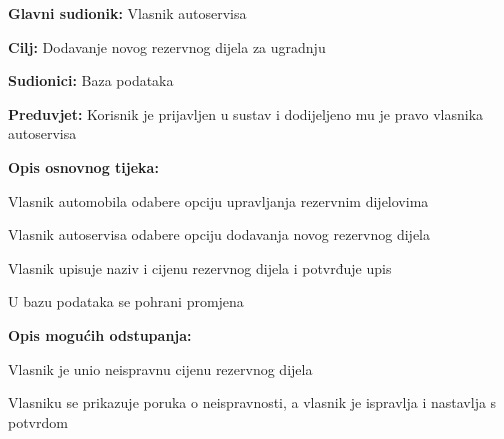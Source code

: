 					
					\noindent {}
					\begin{packed_item}
						
						\item \textbf{Glavni sudionik: } Vlasnik autoservisa
						\item  \textbf{Cilj:} Dodavanje novog rezervnog dijela za ugradnju
						\item  \textbf{Sudionici:} Baza podataka
						\item  \textbf{Preduvjet:} Korisnik je prijavljen u sustav i dodijeljeno mu je pravo vlasnika autoservisa
						\item  \textbf{Opis osnovnog tijeka:}
						
						\item[] \begin{packed_enum}
							
							\item Vlasnik automobila odabere opciju upravljanja rezervnim dijelovima
							\item Vlasnik autoservisa odabere opciju dodavanja novog rezervnog dijela
							\item Vlasnik upisuje naziv i cijenu rezervnog dijela i potvrđuje upis
							\item U bazu podataka se pohrani promjena 
							
						\end{packed_enum}
						
						\item  \textbf{Opis mogućih odstupanja:}
						\item[] \begin{packed_item}
							\item[3.a] Vlasnik je unio neispravnu cijenu rezervnog dijela
							\item[] \begin{packed_enum}
								\item Vlasniku se prikazuje poruka o neispravnosti, a vlasnik je ispravlja i nastavlja s potvrdom
							\end{packed_enum}
						\end{packed_item}
						
					\end{packed_item}
					
				
				
				
				
